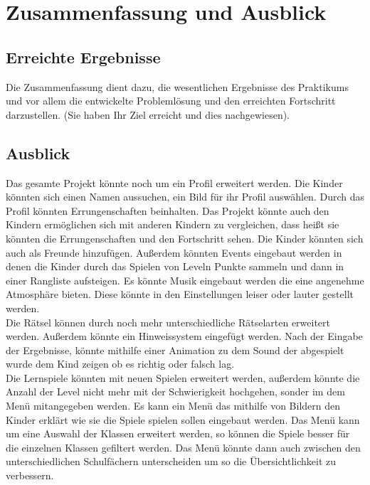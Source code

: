 \chapter{Zusammenfassung und Ausblick}
\label{cha:zusammenfassung}

\section{Erreichte Ergebnisse}
\label{sec:ergebnisse}

Die Zusammenfassung dient dazu, die wesentlichen Ergebnisse des
Praktikums und vor allem die entwickelte Problemlösung und den
erreichten Fortschritt darzustellen. (Sie haben Ihr Ziel erreicht und
dies nachgewiesen).

\section{Ausblick}
\label{sec:ausblick}

Das gesamte Projekt könnte noch um ein Profil erweitert werden. Die Kinder könnten sich einen Namen aussuchen, ein Bild für ihr Profil auswählen. Durch das Profil könnten Errungenschaften beinhalten. Das Projekt könnte auch den Kindern ermöglichen sich mit anderen Kindern zu vergleichen, dass heißt sie könnten die Errungenschaften und den Fortschritt sehen. Die Kinder könnten sich auch als Freunde hinzufügen. Außerdem könnten Events eingebaut werden in denen die Kinder durch das Spielen von Leveln Punkte sammeln und dann in einer Rangliste aufsteigen. Es könnte Musik eingebaut werden die eine angenehme Atmosphäre bieten. Diese könnte in den Einstellungen leiser oder lauter gestellt werden. \\
Die Rätsel können durch noch mehr unterschiedliche Rätselarten erweitert werden. Außerdem könnte ein Hinweissystem eingefügt werden. Nach der Eingabe der Ergebnisse, könnte mithilfe einer Animation zu dem Sound der abgespielt wurde dem Kind zeigen ob es richtig oder falsch lag.\\
Die Lernspiele könnten mit neuen Spielen erweitert werden, außerdem könnte die Anzahl der Level nicht mehr mit der Schwierigkeit hochgehen, sonder im dem Menü mitangegeben werden. Es kann ein Menü das mithilfe von Bildern den Kinder erklärt wie sie die Spiele spielen sollen eingebaut werden. Das Menü kann um eine Auswahl der Klassen erweitert werden, so können die Spiele besser für die einzelnen Klassen gefiltert werden. Das Menü könnte dann auch zwischen den unterschiedlichen Schulfächern unterscheiden um so die Übersichtlichkeit zu verbessern.\\

